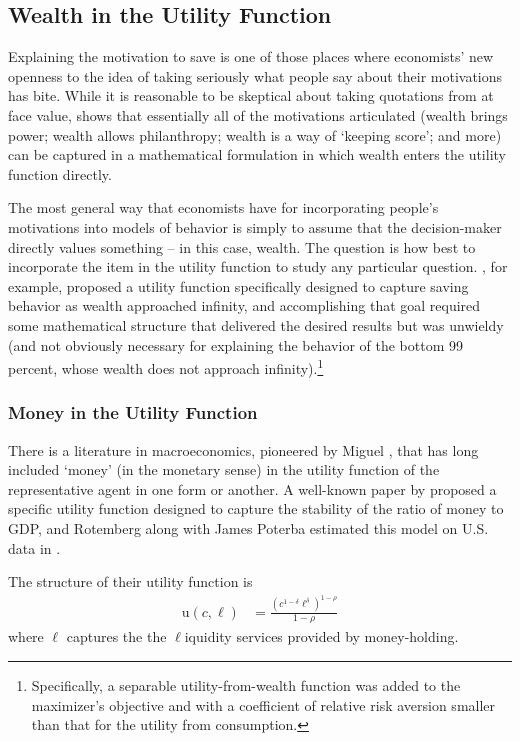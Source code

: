 \documentclass{article}
\newcommand{\CRRA}{\rho}
\newcommand{\uFunc}{\mathrm{u}}
\newcommand{\cNrm}{c}
\newcommand{\lqdt}{\ell}
\begin{document}
\bigskip\subsection{Wealth in the Utility Function}

Explaining the motivation to save is one of those places where economists' new openness to the idea of taking seriously what people say about their motivations has bite.
While it is reasonable to be skeptical about taking quotations from \cite{jaherGilded} at face value, \cite{WhyDoTheRich} shows that essentially all of the motivations articulated (wealth brings power; wealth allows philanthropy; wealth is a way of `keeping score'; and more) can be captured in a mathematical formulation in which wealth enters the utility function directly.

The most general way that economists have for incorporating people's motivations into models of behavior is simply to assume that the decision-maker directly values something -- in this case, wealth.
The question is how best to incorporate the item in the utility function to study any particular question.
\cite{WhyDoTheRich}, for example, proposed a utility function specifically designed to capture saving behavior as wealth approached infinity, and accomplishing that goal required some mathematical structure that delivered the desired results but was unwieldy (and not obviously necessary for explaining the behavior of the bottom 99 percent, whose wealth does not approach infinity).\footnote{Specifically, a separable utility-from-wealth function was added to the maximizer's objective and with a coefficient of relative risk aversion smaller than that for the utility from consumption.}

\subsubsection{Money in the Utility Function}

There is a literature in macroeconomics, pioneered by Miguel \cite{sidrauski1967rational}, that has long included `money' (in the monetary sense) in the utility function of the representative agent in one form or another.
A well-known paper by \cite{Rotemberg1984} proposed a specific utility function designed to capture the stability of the ratio of money to GDP, and Rotemberg along with James Poterba estimated this model on U.S. data in \cite{Poterba_1986}.

The structure of their utility function is
\begin{align}
    \uFunc(\cNrm,\lqdt) & = \frac{\left(
        \cNrm^{1-\delta}\lqdt^{\delta}
        \right)^{1-\CRRA}}{1-\CRRA}
\end{align}
where $\lqdt$ captures the the $\lqdt$iquidity services provided by money-holding.
\end{document}
